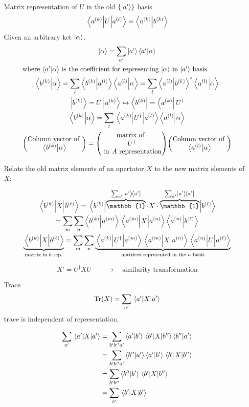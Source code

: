 \begin{frame}{Matrix representation of $U$ in the old $\{\ket{a'}\}$ basis}
	\[
		\mel{a^{(k)}}{U}{a^{(l)}} = \ip{a^{(k)}}{b^{(k)}}
	\]
	Given an arbitrary ket $\ket{\alpha}$.
	\begin{gather*}
		\ket{\alpha} = \sum_{a'} \ket{a'} \bra{a'}\ket{\alpha}\\
		\intertext{where $\ip{a'}{\alpha}$ is the coefficient for representing $\ket{\alpha}$ in $\ket{a'}$ basis.}
		\ip{b^{(k)}}{\alpha} = \sum_l \ip{b^{(k)}}{a^{(l)}} \ip{a^{(l)}}{\alpha} = \sum_l \ip{a^{(l)}}{b^{(k)}}^* \ip{a^{(l)}}{\alpha}\\
		\ket{b^{(k)}} = U \ket{a^{(k)}} \leftrightarrow \bra{b^{(k)}} = \bra{a^{(k)}}U^\dag\\
		\ip{b^{(k)}}{\alpha} = \sum_l \mel{a^{(k)}}{U^\dag}{a^{(l)}}\ip{a^{(l)}}{\alpha}\\
		\mqty(\text{Column vector of }\\ \ip{b^{(k)}}{\alpha}) = \mqty(\text{matrix of } \\ U^\dag \\ \text{ in } A \text{ representation}) \mqty(\text{Column vector of }\\ \ip{a^{(l)}}{\alpha})
	\end{gather*}
\end{frame}

\begin{frame}
	Relate the old matrix elements of an opertator $X$ to the new matrix elements of $X$:

	\begin{gather*}
		\mel{b^{(k)}}{X}{b^{(\ell)}} = \mel{b^{(k)}}{\overbrace{\mathbb{1}}^{\sum_{a'} \op{a'}} \cdot X \cdot \overbrace{\mathbb{1}}^{\sum_{a'} \op{a'}}}{b^{(\ell)}}\\
		= \sum_m \sum_n \ip{b^{(k)}}{a^{(m)}}\mel{a^{(m)}}{X}{a^{(n)}} \ip{a^{(n)}}{b^{(\ell)}}\\
		\underbrace{\mel{b^{(k)}}{X}{b^{(\ell)}}}_{\text{matrix in $b$ rep.}} = \sum_m \sum_n \underbrace{\mel{a^{(k)}}{U^\dag}{a^{(m)}} \mel{a^{(m)}}{X}{a^{(n)}} \mel{a^{(n)}}{U}{a^{(\ell)}}}_{\text{matrices represented in the $a$ basis}}
	\end{gather*}

	$$ X' = U^\dag X U \qquad{\to} \quad \text{similarity transformation}$$
\end{frame}

\begin{frame}{Trace}
	\[\Tr(X) = \sum_{a'} \mel{a'}{X }{a'}\] trace is independent of representation.

	\begin{align*}
		\sum_{a'} \mel{a'}{X }{a'} & = \sum_{b' b'' a'} \ip{a'}{b'} \mel{b'}{X}{b''} \ip{b''}{a'} \\
		                           & = \sum_{b' b'' a'} \ip{b''}{a'} \ip{a'}{b'} \mel{b'}{X}{b''} \\
		                           & = \sum_{b' b''} \ip{b''}{b'} \mel{b'}{X}{b''}                \\
		                           & = \sum_{b'} \ev{X}{b'}
	\end{align*}
\end{frame}

